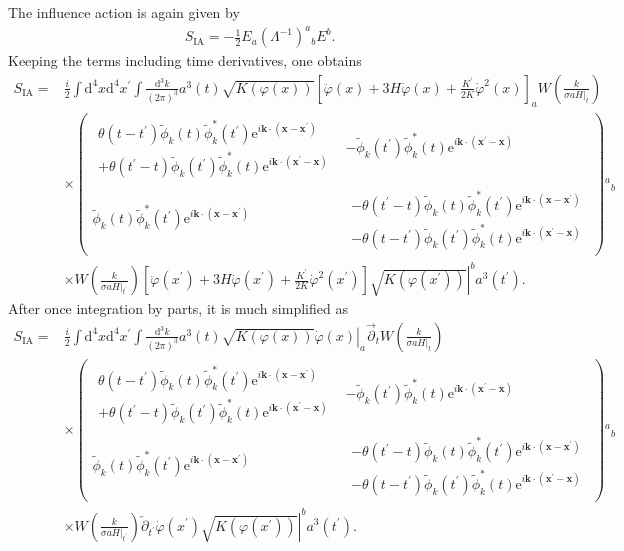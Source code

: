 \documentclass[aps, prd
, preprint
, nofootinbib 
]{revtex4-1}
\newcommand{\dd}{\mathrm{d}}
\newcommand{\ee}{\mathrm{e}}
\newcommand{\dk}{\frac{\dd^3k}{(2\pi)^3}}
\newcommand{\bae}[1]{\begin{align} #1 \end{align}}
\newcommand{\bpme}[1]{\begin{pmatrix} #1 \end{pmatrix}}
\begin{document}
The influence action is again given by
\bae{
	S_\text{IA}=-\frac{1}{2}E_a(\Lambda^{-1})^a{}_bE^b.
}
Keeping the terms including time derivatives, one obtains
\bae{
	S_\text{IA}=&\frac{i}{2}\int\dd^4x\dd^4x^\prime\int\dk a^3(t)\sqrt{K(\varphi(x))}
	\left[\ddot{\varphi}(x)+3H\dot{\varphi}(x)+\frac{K^\prime}{2K}\dot{\varphi}^2(x)\right]_a
	W\left(\frac{k}{\sigma aH|_t}\right) \nonumber \\
	&\times\bpme{
		\begin{array}{c}
			\theta(t-t^\prime)\tilde{\phi}_k(t)\tilde{\phi}_{k}^*(t^\prime)\ee^{i\mathbf{k}\cdot(\mathbf{x}-\mathbf{x}^\prime)} \\
			+\theta(t^\prime-t)\tilde{\phi}_{k}(t^\prime)\tilde{\phi}_k^{*}(t)\ee^{i\mathbf{k}\cdot(\mathbf{x}^\prime-\mathbf{x})}
		\end{array} &
		-\tilde{\phi}_{k}(t^\prime)\tilde{\phi}_k^{*}(t)\ee^{i\mathbf{k}\cdot(\mathbf{x}^\prime-\mathbf{x})} \\
		\tilde{\phi}_k(t)\tilde{\phi}_{k}^*(t^\prime)\ee^{i\mathbf{k}\cdot(\mathbf{x}-\mathbf{x}^\prime)} &
		\begin{array}{c}
			-\theta(t^\prime-t)\tilde{\phi}_k(t)\tilde{\phi}_{k}^*(t^\prime)\ee^{i\mathbf{k}\cdot(\mathbf{x}-\mathbf{x}^\prime)} \\
			-\theta(t-t^\prime)\tilde{\phi}_{k}(t^\prime)\tilde{\phi}_k^{*}(t)\ee^{i\mathbf{k}\cdot(\mathbf{x}^\prime-\mathbf{x})}
		\end{array}
	}{}^a{}_b \nonumber \\
	&\times W\left(\frac{k}{\sigma aH|_{t^\prime}}\right)
	\left.\left[\ddot{\varphi}(x^\prime)+3H\dot{\varphi}(x^\prime)+\frac{K^\prime}{2K}\dot{\varphi}^2(x^\prime)\right]
	\sqrt{K(\varphi(x^\prime))}\right|^ba^3(t^\prime).
}
After once integration by parts, it is much simplified as
\bae{
	S_\text{IA}=&\frac{i}{2}\int\dd^4x\dd^4x^\prime\int\dk a^3(t)\left.\sqrt{K(\varphi(x))}\dot{\varphi}(x)\right|_a\overrightarrow{\partial}_t
	W\left(\frac{k}{\sigma aH|_t}\right) \nonumber \\
	&\times\bpme{
		\begin{array}{c}
			\theta(t-t^\prime)\tilde{\phi}_k(t)\tilde{\phi}_{k}^*(t^\prime)\ee^{i\mathbf{k}\cdot(\mathbf{x}-\mathbf{x}^\prime)} \\
			+\theta(t^\prime-t)\tilde{\phi}_{k}(t^\prime)\tilde{\phi}_k^{*}(t)\ee^{i\mathbf{k}\cdot(\mathbf{x}^\prime-\mathbf{x})}
		\end{array} &
		-\tilde{\phi}_{k}(t^\prime)\tilde{\phi}_k^{*}(t)\ee^{i\mathbf{k}\cdot(\mathbf{x}^\prime-\mathbf{x})} \\
		\tilde{\phi}_k(t)\tilde{\phi}_{k}^*(t^\prime)\ee^{i\mathbf{k}\cdot(\mathbf{x}-\mathbf{x}^\prime)} &
		\begin{array}{c}
			-\theta(t^\prime-t)\tilde{\phi}_k(t)\tilde{\phi}_{k}^*(t^\prime)\ee^{i\mathbf{k}\cdot(\mathbf{x}-\mathbf{x}^\prime)} \\
			-\theta(t-t^\prime)\tilde{\phi}_{k}(t^\prime)\tilde{\phi}_k^{*}(t)\ee^{i\mathbf{k}\cdot(\mathbf{x}^\prime-\mathbf{x})}
		\end{array}
	}{}^a{}_b \nonumber \\
	&\times W\left(\frac{k}{\sigma aH|_{t^\prime}}\right)\overleftarrow{\partial}_{t^\prime}
	\left.\dot{\varphi}(x^\prime)
	\sqrt{K(\varphi(x^\prime))}\right|^ba^3(t^\prime).
}
\end{document}
